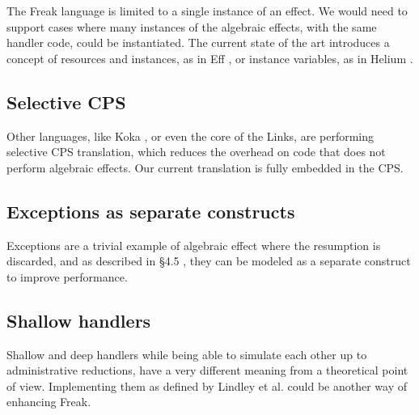 \documentclass{article}
\theoremstyle{definition}
\theoremstyle{lemma}
\theoremstyle{observation}
\theoremstyle{theorem}
\begin{document}
    The Freak language is limited to a single instance of an effect. We would
    need to support cases where many instances of the algebraic effects, with
    the same handler code, could be instantiated. The current state of the
    art introduces a concept of resources and instances, as in Eff \cite{programming-in-eff},
    or instance variables, as in Helium \cite{binders-labels}.

    \subsection{Selective CPS}

    Other languages, like Koka \cite{leijen-koka}, or even the core of the Links, are
    performing selective CPS translation, which reduces the overhead on code
    that does not perform algebraic effects. Our current translation is fully
    embedded in the CPS.

    \subsection{Exceptions as separate constructs}

    Exceptions are a trivial example of algebraic effect where the resumption is
    discarded, and as described in \S 4.5 \cite{handlers-cps}, they can be modeled
    as a separate construct to improve performance.

    \subsection{Shallow handlers}

    Shallow and deep handlers while being able to simulate each other up to
    administrative reductions, have a very different meaning from a theoretical
    point of view. Implementing them as defined by Lindley et al. \cite{shallow-handlers} could
    be another way of enhancing Freak.

\printbibliography
\end{document}
